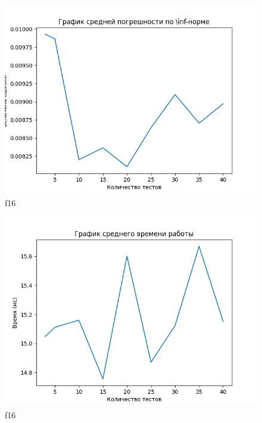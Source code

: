 \documentclass[12pt]{article}
\begin{document}
	\begin{figure}[h]
		\centering
		\includegraphics[width=16cm]{"../plots/plot-total-t2-f16.png"}
		\caption{f16}
		\label{fig:t-t2-f16}
	\end{figure}
	
	\begin{figure}[h]
		\centering
		\includegraphics[width=16cm]{"../plots/plot-total-t3-f16.png"}
		\caption{f16}
		\label{fig:t-t3-f16}
	\end{figure}
	
\end{document}

